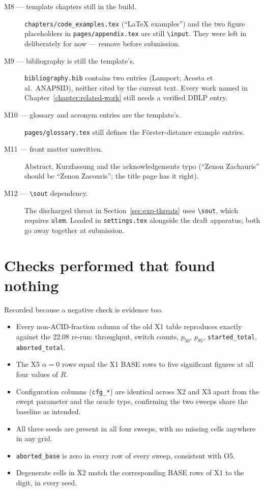 \begin{description}

\item[M8 --- template chapters still in the build.]
\texttt{chapters/code\_examples.tex} (``LaTeX examples'') and the two
figure placeholders in \texttt{pages/appendix.tex} are still
\texttt{\textbackslash input}. They were left in deliberately for now
--- remove before submission.

\item[M9 --- bibliography is still the template's.]
\texttt{bibliography.bib} contains two entries (Lamport; Acosta et al.\
ANAPSID), neither cited by the current text. Every work named in
Chapter~\ref{chapter:related-work} still needs a verified DBLP entry.

\item[M10 --- glossary and acronym entries are the template's.]
\texttt{pages/glossary.tex} still defines the Förster-distance example
entries.

\item[M11 --- front matter unwritten.] Abstract, Kurzfassung and the
acknowledgements typo (``Zenon Zachauris'' should be ``Zenon
Zacouris''; the title page has it right).

\item[M12 --- \texttt{\textbackslash sout} dependency.] The discharged
threat in Section~\ref{sec:exp-threats} uses \texttt{\textbackslash sout},
which requires \texttt{ulem}. Loaded in \texttt{settings.tex} alongside
the draft apparatus; both go away together at submission.

\end{description}

\section{Checks performed that found nothing}\label{sec:reg-clean}

Recorded because a negative check is evidence too.

\begin{itemize}
\item Every non-ACID-fraction column of the old X1 table reproduces
exactly against the 22.08 re-run: throughput, switch counts, $p_{50}$,
$p_{95}$, \texttt{started\_total}, \texttt{aborted\_total}.
\item The X5 $\alpha = 0$ rows equal the X1 BASE rows to five
significant figures at all four values of $R$.
\item Configuration columns (\texttt{cfg\_*}) are identical across X2 and
X3 apart from the swept parameter and the oracle type, confirming the
two sweeps share the baseline as intended.
\item All three seeds are present in all four sweeps, with no missing
cells anywhere in any grid.
\item \texttt{aborted\_base} is zero in every row of every sweep,
consistent with O5.
\item Degenerate cells in X2 match the corresponding BASE rows of X1 to
the digit, in every seed.
\end{itemize}
